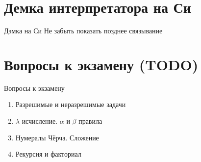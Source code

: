 \section{Демка интерпретатора на Си}
\begin{frame}{Дэмка на Си}
  Не забыть показать позднее связывание
\end{frame}

\section*{Вопросы к экзамену (TODO)}
\begin{frame}{Вопросы к экзамену}
\begin{enumerate}
  \item Разрешимые и неразрешимые задачи
  \item $\lambda$-исчисление. $\alpha$ и $\beta$ правила
  \item Нумералы Чёрча. Сложение
  \item Рекурсия и факториал
\end{enumerate}
\end{frame}

